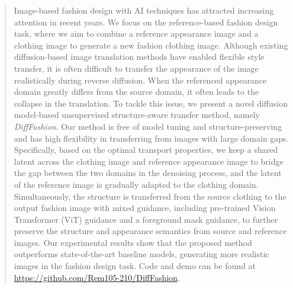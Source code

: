 \begin{abstract}
Image-based fashion design with AI techniques has attracted increasing attention in recent years. 
We focus on the reference-based fashion design task, where we aim to combine a reference appearance image and a clothing image to generate a new fashion clothing image. 
Although existing diffusion-based image translation methods have enabled flexible style transfer, it is often difficult to transfer the appearance of the image realistically during reverse diffusion. When the referenced appearance domain greatly differs from the source domain, it often leads to the collapse in the translation.
To tackle this issue, we present a novel diffusion model-based unsupervised structure-aware transfer method, namely \textit{DiffFashion}.
Our method is free of model tuning and structure-preserving and has high flexibility in transferring from images with large domain gaps.
Specifically, based on the optimal transport properties, we keep a shared latent across the clothing image and reference appearance image to bridge the gap between the two domains in the denoising process, and the latent of the reference image is gradually adapted to the clothing domain. 
Simultaneously, the structure is transferred from the source clothing to the output fashion image with mixed guidance, including pre-trained Vision Transformer (ViT) guidance and a foreground mask guidance, to further preserve the structure and appearance semantics from source and reference images. 
Our experimental results show that the proposed method outperforms state-of-the-art baseline models, generating more realistic images in the fashion design task. Code and demo can be found at \href{https://github.com/Rem105-210/DiffFashion}{https://github.com/Rem105-210/DiffFashion}.
\end{abstract}

